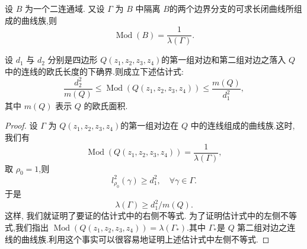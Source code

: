 \begin{thm}
    设 $B$ 为一个二连通域. 又设 $\Gamma$ 为 $B$ 中隔离 $B$的两个边界分支的可求长闭曲线所组成的曲线族,则
    \[\operatorname{Mod}(B)=\frac{1}{\lambda(\Gamma)}.\]
\end{thm}

\begin{theorem}
    设 $d_1$ 与 $d_2$ 分别是四边形 $Q(z_1,z_2,z_3,z_4)$的第一组对边和第二组对边之落入 $Q$ 中的连线的欧氏长度的下确界.则成立下述估计式:
    \[\frac{d_2^2}{m(Q)}\leqslant \operatorname{Mod}(Q(z_1,z_2,z_3,z_4))\leqslant \frac{m(Q)}{d_1^2},\]
    其中 $m(Q)$ 表示 $Q$ 的欧氏面积.
\end{theorem}
\begin{proof}
    设 $\Gamma$ 为 $Q(z_1,z_2,z_3,z_4)$的第一组对边在 $Q$ 中的连线组成的曲线族.这时, 我们有
    \[\operatorname{Mod}(Q(z_1,z_2,z_3,z_4))=\frac{1}{\lambda(\Gamma)},\]
    取 $\rho_0=1$,则
    \[l_{\rho_0}^2 (\gamma)\geqslant d_1^2,\quad\forall \gamma\in \Gamma.\]
    于是
    \[\lambda(\Gamma)\geqslant d_1^2/m(Q).\]
    这样, 我们就证明了要证的估计式中的右侧不等式.
    为了证明估计式中的左侧不等式,我们指出 $\operatorname{Mod}(Q(z_1,z_2,z_3,z_4))=\lambda(\Gamma_*)$.其中 $\Gamma_*$是 $Q$ 第二组对边之连线的曲线族.利用这个事实可以很容易地证明上述估计式中左侧不等式.
\end{proof}

